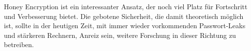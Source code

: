 \documentclass[12pt]{scrartcl}
\begin{document}
Honey Encryption ist ein interessanter Ansatz, der noch viel Platz für Fortschritt und Verbesserung bietet. Die gebotene Sicherheit, die damit theoretisch möglich ist, sollte in der heutigen Zeit, mit immer wieder vorkommenden Passwort-Leaks und stärkeren Rechnern, Anreiz sein, weitere Forschung in dieser Richtung zu betreiben.



\end{document}
